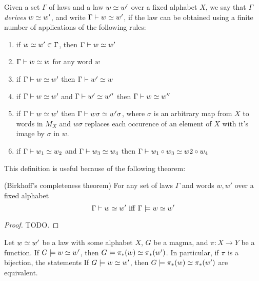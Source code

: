 \begin{definition}[Derivation]\label{derivation-def}
  \leanok
  Given a set $\Gamma$ of laws and a law $w\simeq w'$ over a fixed alphabet $X$, we say that
  $\Gamma$ \emph{derives} $w\simeq w'$, and write $\Gamma\vdash w\simeq w'$, if the law can
  be obtained using a finite number of applications of the following rules:
  \begin{enumerate}
    \item if $w\simeq w' \in \Gamma$, then $\Gamma\vdash w\simeq w'$
    \item $\Gamma\vdash w\simeq w$ for any word $w$
    \item if $\Gamma\vdash w\simeq w'$ then $\Gamma\vdash w'\simeq w$
    \item if $\Gamma\vdash w\simeq w'$ and $\Gamma\vdash w'\simeq w''$ then $\Gamma\vdash w\simeq w''$
    \item if $\Gamma\vdash w\simeq w'$ then $\Gamma\vdash w\sigma\simeq w'\sigma$, where $\sigma$ is an arbitrary map from $X$ to words in $M_X$ and $w\sigma$ replaces each occurence of an element of $X$ with it's image by $\sigma$ in $w$.
    \item if $\Gamma\vdash w_1\simeq w_2$ and $\Gamma\vdash w_3\simeq w_4$ then $\Gamma\vdash w_1 \circ w_3\simeq w2\circ w_4$
  \end{enumerate}
\end{definition}

This definition is useful because of the following theorem:

\begin{theorem}[Completeness]\label{sound-complete} (Birkhoff's completeness theorem)
  \leanok
  For any set of laws $\Gamma$ and words $w, w'$ over a fixed alphabet
  $$ \Gamma\vdash w\simeq w'\ \mathrm{iff}\ \Gamma\models w\simeq w' $$
\end{theorem}
\begin{proof}
  \leanok
  TODO.
\end{proof}

\begin{lemma}[Pushforward]\label{push}  Let $w \simeq w'$ be a law with some alphabet $X$, $G$ be a magma, and $\pi: X \to Y$ be a function.  If $G \models w \simeq w'$, then $G \models \pi_*(w) \simeq \pi_*(w')$.  In particular, if $\pi$ is a bijection, the statements If $G \models w \simeq w'$, then $G \models \pi_*(w) \simeq \pi_*(w')$ are equivalent.
\end{lemma}

